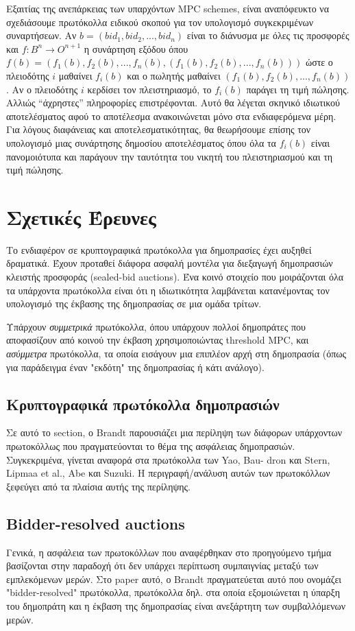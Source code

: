 \documentclass[letterpaper,11pt]{article}
\begin{document}
Εξαιτίας της ανεπάρκειας των υπαρχόντων MPC schemes, είναι αναπόφευκτο να σχεδιάσουμε πρωτόκολλα ειδικού
σκοπού για τον υπολογισμό συγκεκριμένων συναρτήσεων. Αν $b = (bid_1, bid_2, ..., bid_n)$ είναι το διάνυσμα με
όλες τις προσφορές και $f: B^n \rightarrow O^{n+1}$ η συνάρτηση εξόδου όπου $f(b) = (f_1(b), f_2(b), ...,
f_n(b),(f_1(b), f_2(b), ...,f_n(b)))$ ώστε ο πλειοδότης $i$ μαθαίνει $f_i(b)$ και ο πωλητής μαθαίνει $(f_1(b),
f_2(b), ..., f_n(b))$. Αν ο πλειοδότης $i$ κερδίσει τον πλειστηριασμό, το $f_i(b)$ παράγει τη τιμή πώλησης.
Αλλιώς “άχρηστες” πληροφορίες επιστρέφονται. Αυτό θα λέγεται σκηνικό ιδιωτικού αποτελέσματος αφού το
αποτέλεσμα ανακοινώνεται μόνο στα ενδιαφερόμενα μέρη. Για λόγους διαφάνειας και αποτελεσματικότητας, θα
θεωρήσουμε επίσης τον υπολογισμό μιας συνάρτησης δημοσίου αποτελέσματος όπου όλα τα $f_i(b)$ είναι
πανομοιότυπα και παράγουν την ταυτότητα του νικητή του πλειστηριασμού και τη τιμή πώλησης.

\section{Σχετικές Έρευνες} Το ενδιαφέρον σε κρυπτογραφικά πρωτόκολλα για δημοπρασίες έχει αυξηθεί δραματικά.
Έχουν προταθεί διάφορα ασφαλή μοντέλα για διεξαγωγή δημοπρασιών κλειστής προσφοράς (sealed-bid auctions). Ένα
κοινό στοιχείο που μοιράζονται όλα τα υπάρχοντα πρωτόκολλα είναι ότι η ιδιωτικότητα λαμβάνεται κατανέμοντας
τον υπολογισμό της έκβασης της δημοπρασίας σε μια ομάδα τρίτων.

Υπάρχουν \emph{συμμετρικά} πρωτόκολλα, όπου υπάρχουν πολλοί δημοπράτες που αποφασίζουν από κοινού την έκβαση
χρησιμοποιώντας threshold MPC, και \emph{ασύμμετρα} πρωτόκολλα, τα οποία εισάγουν μια επιπλέον αρχή στη
δημοπρασία (όπως για παράδειγμα έναν "εκδότη" της δημοπρασίας ή κάτι ανάλογο).

	\subsection{Κρυπτογραφικά πρωτόκολλα δημοπρασιών}
	Σε αυτό το section, ο Brandt παρουσιάζει μια περίληψη των διάφορων υπάρχοντων πρωτοκόλλως που πραγματεύονται
	το θέμα της ασφάλειας δημοπρασιών. Συγκεκριμένα, γίνεται αναφορά στα πρωτόκολλα των Yao, Bau- dron και Stern,
	Lipmaa et al., Abe και Suzuki. Η περιγραφή/ανάλυση αυτών των πρωτοκόλλων ξεφεύγει από τα πλαίσια αυτής της περίληψης.
	
	\subsection{Bidder-resolved auctions}
	Γενικά, η ασφάλεια των πρωτοκόλλων που αναφέρθηκαν στο προηγούμενο τμήμα βασίζονται στην παραδοχή ότι δεν υπάρχει
	περίπτωση συμπαιγνίας μεταξύ των εμπλεκόμενων μερών. Στο paper αυτό, ο Brandt πραγματεύεται αυτό που ονομάζει 
	"bidder-resolved" πρωτόκολλα, πρωτόκολλα δηλ. στα οποία εξομοιώνεται η ύπαρξη του δημοπράτη και η έκβαση της δημοπρασίας
	είναι ανεξάρτητη των συμβαλλόμενων μερών.
	
\end{document}
